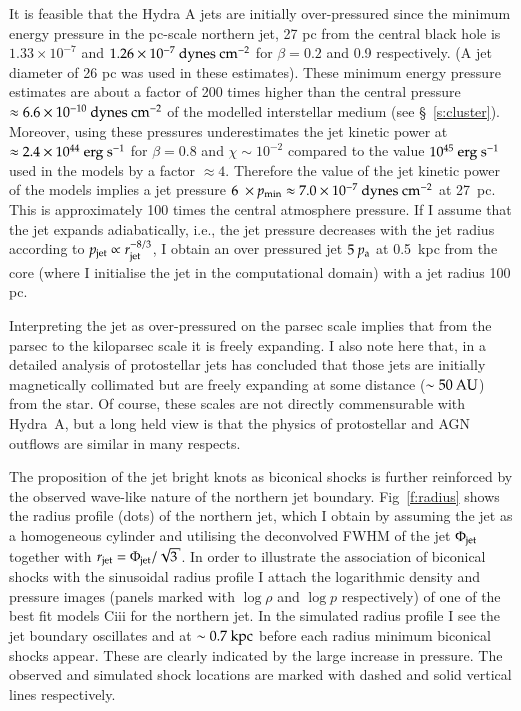It is feasible that the Hydra A jets are initially over-pressured since the minimum energy pressure in the pc-scale northern jet, 27 pc from the central black hole \citep{taylor96} is $1.33\times10^{-7}$ and $1.26\times10^{-7} \rm \ dynes \ cm^{-2}$ for $\beta=0.2$ and 0.9 respectively. (A jet diameter of 26 pc was used in these estimates). These minimum energy pressure estimates are about a factor of 200 times higher than the central pressure $\approx 6.6\times10^{-10} \rm \ dynes \ cm^{-2}$ of the modelled interstellar medium (see \S~\ref{s:cluster}). Moreover, using these pressures underestimates the jet kinetic power at $ \approx 2.4 \times10^{44} \ \rm erg \ s^{-1}$ for $\beta =0.8$ and $\chi \sim 10^{-2}$ compared to the value $10^{45} \ \rm erg \ s^{-1}$ used in the models by a factor $\approx 4$. Therefore the value of the jet kinetic power of the models implies a jet pressure $6~\times p_{\rm min} \approx 7.0 \times 10^{-7} \rm \ dynes \ cm^{-2} $ at 27~pc. This is approximately 100 times the central atmosphere pressure. If I assume that the jet expands adiabatically, i.e., the jet pressure decreases with the jet radius according to $p_{\rm jet}\propto r_{\rm jet}^{-8/3}$, I obtain an over pressured jet $5~p_{\rm a}$ at 0.5~kpc  from the core (where I initialise the jet in the computational domain) with a jet radius 100 pc. 


Interpreting the jet as over-pressured on the parsec scale implies that from the parsec to the kiloparsec scale it is freely expanding. I also note here that, in a detailed analysis of protostellar jets \citet{cabrit07a} has concluded that those jets are initially magnetically collimated but are freely expanding at some distance ($\sim 50 \> \rm AU$) from the star. Of course, these scales are not directly commensurable with Hydra~A, but a long held view is that the physics of protostellar and AGN outflows are similar in many respects.


The proposition of the jet bright knots as biconical shocks is further reinforced by the observed wave-like nature of the northern jet boundary. Fig~\ref{f:radius} shows the radius profile (dots) of the northern jet, which I obtain by assuming the jet as a homogeneous cylinder and utilising the deconvolved FWHM of the jet \citep{taylor90} $\Phi_{\rm jet}$ together with $r_{\rm jet} = \Phi_{\rm jet}/ \sqrt{3}$. In order to illustrate the association of biconical shocks with the sinusoidal radius profile I attach the logarithmic density and pressure images (panels marked with $\log\rho$ and $\log p$ respectively) of one of the best fit models Ciii for the northern jet. In the simulated radius profile I see the jet boundary oscillates and at $\sim 0.7 \ \rm kpc$ before each radius minimum biconical shocks appear. These are clearly indicated by the large increase in pressure. The observed and simulated shock locations are marked with dashed and solid vertical lines respectively.

